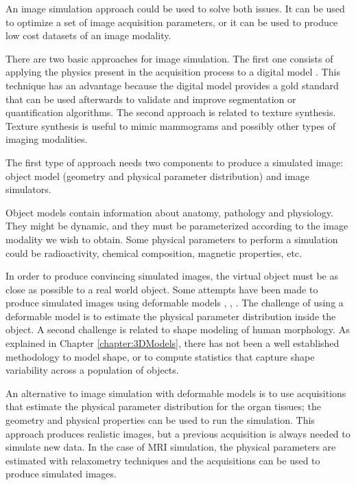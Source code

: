 An image simulation approach could be used to solve both issues. 
It can be used to optimize a set of image acquisition parameters, 
or it can be used to produce low cost datasets of an image modality.

There are two basic approaches for image simulation. The first one consists of 
applying the physics present in the acquisition process to a digital model \cite{CHAR-09}.
This technique has an advantage because
the digital model provides a gold standard that can be used afterwards to validate 
and improve segmentation or quantification algorithms.
The second approach is related to texture synthesis. Texture synthesis is useful to mimic mammograms \cite{Castella:08}
and possibly other types of imaging modalities. 

The first type of approach needs 
two components to produce a simulated image: object model (geometry and physical parameter distribution)
and image simulators.

Object models contain information about anatomy, pathology and physiology. They might be
dynamic, and they must be parameterized according to the image modality we wish to obtain. 
Some physical parameters to perform a simulation could be
radioactivity, chemical composition, magnetic properties, etc. 

In order to produce convincing simulated images, the virtual object must be as close as possible to a real world object. 
Some attempts have been made to produce simulated images 
using deformable models \cite{segars2008realistic}, \cite{le2009incorporating}, \cite{tobon2011realistic}.
The challenge of using a deformable model is to 
estimate the physical parameter distribution inside the object. A second challenge is related to shape modeling of human morphology. 
As explained in Chapter \ref{chapter:3DModels}, there has not been a well established 
methodology to model shape, or to compute statistics that capture shape variability across 
a population of objects. 

An alternative to image simulation with deformable models 
is to use acquisitions that estimate the physical parameter
distribution for the organ tissues; 
the geometry and physical properties can be used to run the simulation.
This approach produces realistic images, but a previous acquisition 
is always needed to simulate new data. 
In the case of MRI simulation, the physical parameters are estimated with 
relaxometry techniques and the acquisitions can be used to produce simulated images.


